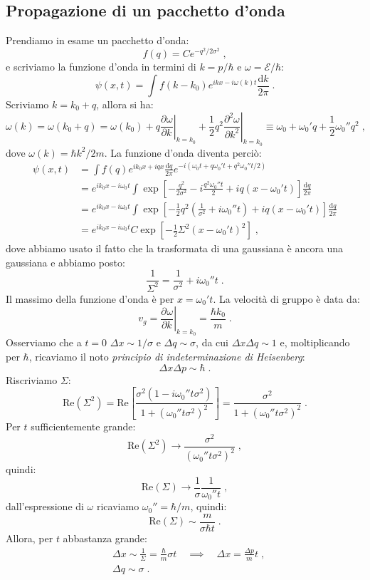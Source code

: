 \documentclass[12pt,a4paper]{report}
\theoremstyle{definition}
\newcommand{\pdev}[3][]{\frac{\partial^{#1} #2}{\partial #3^{#1}}}
\numberwithin{equation}{section}
\newcommand{\diff}[1][]{\mathrm{d}#1}
\begin{document}
\subsection*{Propagazione di un pacchetto d'onda}
Prendiamo in esame un pacchetto d'onda:
$$
f(q)=Ce^{-q^2/2\sigma^2}\;,
$$
e scriviamo la funzione d'onda in termini di $k=p/\hbar$ e $\omega=\mathcal{E}/\hbar$:
\begin{equation}
\psi(x,t)=\int f(k-k_0)e^{ikx-i\omega(k)t}\frac{\diff{k}}{2\pi}\;.
\end{equation}
Scriviamo $k=k_0+q$, allora si ha:
$$
\omega(k)=\omega(k_0+q)=\omega(k_0)+q\left.\pdev{\omega}{k}\right|_{k=k_0}+\frac{1}{2}q^2\left.\pdev[2]{\omega}{k}\right|_{k=k_0}\equiv \omega_0+\omega_0'q+\frac{1}{2}\omega_0''q^2\;,
$$
dove $\omega(k)=\hbar k^2/2m$. La funzione d'onda diventa perciò:
\begin{align*}
\psi(x,t)&= \int f(q)e^{ik_0x+iqx}\frac{\diff{q}}{2\pi}e^{-i(\omega_0t+q\omega_0't+q^2\omega_0''t/2)} \\
&= e^{ik_0x-i\omega_0t}\int \exp\left[-\frac{q^2}{2\sigma^2}-i\frac{q^2\omega_0''t}{2}+iq(x-\omega_0't)\right]\frac{\diff{q}}{2\pi} \\
&= e^{ik_0x-i\omega_0t}\int \exp\left[-\frac{1}{2}q^2\left(\frac{1}{\sigma^2}+i\omega_0''t\right)+iq(x-\omega_0't)\right]\frac{\diff{q}}{2\pi}
\\
&=e^{ik_0x-i\omega_0t}C\exp\left[-\frac{1}{2}\Sigma^2(x-\omega_0't)^2\right]\;,
\end{align*}
dove abbiamo usato il fatto che la trasformata di una gaussiana è ancora una gaussiana e abbiamo posto:
$$
\frac{1}{\Sigma^2}=\frac{1}{\sigma^2}+i\omega_0''t\;.
$$
Il massimo della funzione d'onda è per $x=\omega_0't$. La velocità di gruppo è data da:
$$
v_g=\left.\pdev{\omega}{k}\right|_{k=k_0}=\frac{\hbar k_0}{m}\;.
$$
Osserviamo che a $t=0$ $\Delta x \sim 1/\sigma$ e $\Delta q \sim \sigma$, da cui $\Delta x\Delta q \sim 1$ e, moltiplicando per $\hbar$, ricaviamo il noto \textit{principio di indeterminazione di Heisenberg}:
\begin{equation}
\Delta x\Delta p \sim \hbar\;.
\end{equation}
Riscriviamo $\Sigma$:
$$
\mathrm{Re}(\Sigma^2)=\mathrm{Re}\left[\frac{\sigma^2(1-i\omega_0''t\sigma^2)}{1+(\omega_0''t\sigma^2)^2}\right]=\frac{\sigma^2}{1+(\omega_0''t\sigma^2)^2}\;.
$$
Per $t$ sufficientemente grande:
$$
\mathrm{Re}(\Sigma^2)\longrightarrow \frac{\sigma^2}{(\omega_0''t\sigma^2)^2}\;,
$$
quindi:
$$
\mathrm{Re}(\Sigma)\longrightarrow \frac{1}{\sigma}\frac{1}{\omega_0''t}\;,
$$
dall'espressione di $\omega$ ricaviamo $\omega_0''=\hbar/m$, quindi:
$$
\mathrm{Re}(\Sigma)\sim \frac{m}{\sigma\hbar t}\;.
$$
Allora, per $t$ abbastanza grande:
\begin{align*}
&\Delta x\sim \frac{1}{\Sigma}=\frac{\hbar}{m}\sigma t\quad \implies\quad \Delta x=\frac{\Delta p}{m}t\;, \\
&\Delta q\sim\sigma\;.
\end{align*}
\end{document}
